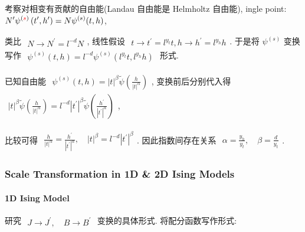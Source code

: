 \documentclass[../../main.tex]{subfiles}
\begin{document}
考察对相变有贡献的自由能(Landau 自由能是 Helmholtz 自由能), {\color{red}{S}}ingle point: $\begin{aligned}
    N^{\prime}\psi^{({\color{red}{s}})}\left(t^{\prime},h^{\prime}\right) = N\psi^{(s)}(t,h)
\end{aligned}$,

类比 $\begin{aligned}
    N\rightarrow N^{\prime} = l^{-d}N
\end{aligned}$, 线性假设 $\begin{aligned}
    t\rightarrow t^{\prime} = l^{y_{t}}t, h\rightarrow h^{\prime} = l^{y_{h}}h
\end{aligned}$. 于是将 $\psi^{(s)}$ 变换写作 $\begin{aligned}
    \psi^{(s)}(t,h) = l^{-d}\psi^{(s)}\left(l^{y_{t}}t,l^{y_{h}}h\right)
\end{aligned}$ 形式. 

已知自由能 $\begin{aligned}
    \psi^{(s)}(t,h) = |t|^{\beta}\widetilde{\psi}\left(\frac{h}{|t|^{\alpha}}\right)
\end{aligned}$, 变换前后分别代入得 $\begin{aligned}
    |t|^{\beta}\widetilde{\psi}\left(\frac{h}{|t|^{\alpha}}\right) = l^{-d}\left|t^{\prime}\right|^{\beta}\widetilde{\psi}\left(\frac{h^{\prime}}{\left|t^{\prime}\right|^{\alpha}}\right)
\end{aligned}$, 

比较可得 $\begin{aligned}
    \frac{h}{|t|^{\alpha}} = \frac{h^{\prime}}{\left|t^{\prime}\right|^{\alpha}},\quad |t|^{\beta} = l^{-d}\left|t^{\prime}\right|^{\beta}
\end{aligned}$. 因此指数间存在关系 $\begin{aligned}
    \alpha = \frac{y_{h}}{y_{t}},\quad \beta = \frac{d}{y_{t}}
\end{aligned}$. 

\subsubsection{Scale Transformation in 1D \& 2D Ising Models}

\paragraph{1D Ising Model}

研究 $\begin{aligned}
    J\rightarrow J^{\prime},\quad B\rightarrow B^{\prime}
\end{aligned}$ 变换的具体形式. 将配分函数写作形式: 
\end{document}
